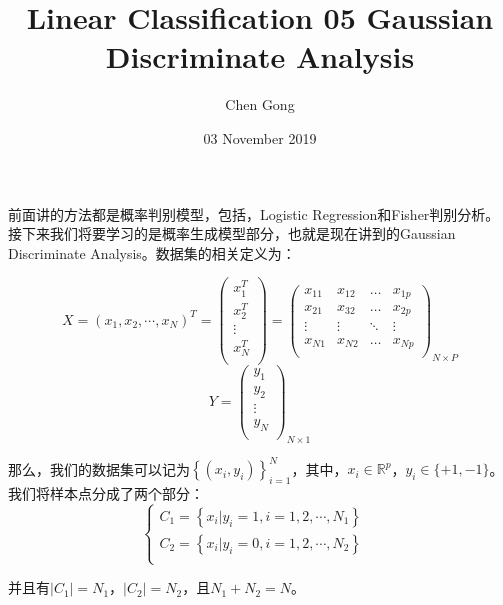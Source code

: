 \documentclass[a4paper]{article}
\title{Linear Classification 05 Gaussian Discriminate Analysis}
\author{Chen Gong}
\date{03 November 2019}
\begin{document}
\maketitle

前面讲的方法都是概率判别模型，包括，Logistic Regression和Fisher判别分析。接下来我们将要学习的是概率生成模型部分，也就是现在讲到的Gaussian Discriminate Analysis。数据集的相关定义为：

\begin{equation}
    X=(x_1, x_2, \cdots, x_N)^T=
    \begin{pmatrix}
    x_1^T \\ 
    x_2^T \\
    \vdots\\
    x_N^T \\
    \end{pmatrix} =
    \begin{pmatrix}
    x_{11} & x_{12} & \dots & x_{1p}\\
    x_{21} & x_{32} & \dots & x_{2p}\\
    \vdots & \vdots & \ddots & \vdots\\
    x_{N1} & x_{N2} & \dots & x_{Np}\\
    \end{pmatrix}_{N\times P}
\end{equation}
\begin{equation}
    Y=
    \begin{pmatrix}
    y_1 \\ 
    y_2 \\
    \vdots\\
    y_N \\
    \end{pmatrix}_{N\times 1}
\end{equation}

那么，我们的数据集可以记为$\left\{ (x_i,y_i) \right\}_{i=1}^N$，其中，$x_i \in \mathbb{R}^p$，$y_i\in\{+1,-1\}$。我们将样本点分成了两个部分：
\begin{equation}
    \left\{
        \begin{array}{ll}
            C_1 = \left\{ x_i|y_i=1, i=1,2,\cdots,N_1 \right\} & \\
            C_2 = \left\{ x_i|y_i=0, i=1,2,\cdots,N_2 \right\} & \\
        \end{array}
    \right.
\end{equation}

并且有$|C_1|=N_1$，$|C_2|=N_2$，且$N_1+N_2=N$。
\end{document}
